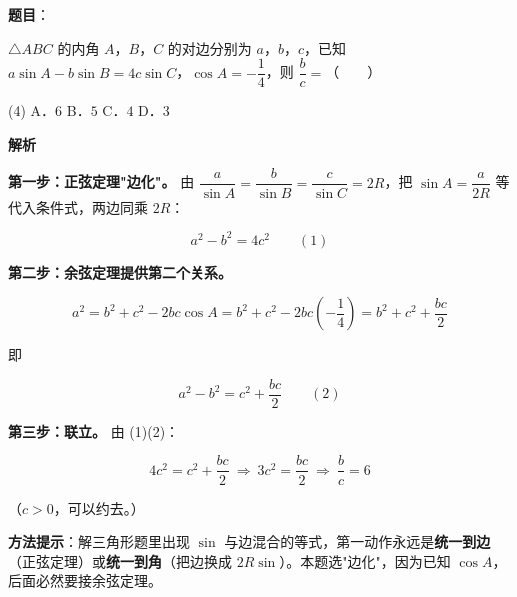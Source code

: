 \begin{answer}

\textbf{题目}：

$\triangle ABC$ 的内角 $A$，$B$，$C$ 的对边分别为 $a$，$b$，$c$，已知 $a\sin A-b\sin B=4c\sin C$，$\cos A=-\dfrac14$，则 $\dfrac bc=$\mbox{（　　）}

\begin{gkopts}(4)
\task A．$6$
\task B．$5$
\task C．$4$
\task D．$3$
\end{gkopts}

\textbf{解析}

\textbf{第一步：正弦定理"边化"。} 由 $\dfrac a{\sin A}=\dfrac b{\sin B}=\dfrac c{\sin C}=2R$，把 $\sin A=\dfrac a{2R}$ 等代入条件式，两边同乘 $2R$：

\nopagebreak[4]
\[a^{2}-b^{2}=4c^{2}\qquad(1)\]

\textbf{第二步：余弦定理提供第二个关系。}

\nopagebreak[4]
\[a^{2}=b^{2}+c^{2}-2bc\cos A=b^{2}+c^{2}-2bc\left(-\frac14\right)=b^{2}+c^{2}+\frac{bc}2\]

即

\nopagebreak[4]
\[a^{2}-b^{2}=c^{2}+\frac{bc}2\qquad(2)\]

\textbf{第三步：联立。} 由 (1)(2)：

\nopagebreak[4]
\[4c^{2}=c^{2}+\frac{bc}2\ \Longrightarrow\ 3c^{2}=\frac{bc}2\ \Longrightarrow\ \frac bc=6\]

（$c>0$，可以约去。）

\begin{gktip}
\textbf{方法提示}：解三角形题里出现 $\sin$ 与边混合的等式，第一动作永远是\textbf{统一到边}（正弦定理）或\textbf{统一到角}（把边换成 $2R\sin$）。本题选"边化"，因为已知 $\cos A$，后面必然要接余弦定理。
\end{gktip}


\par\medskip

\end{answer}
